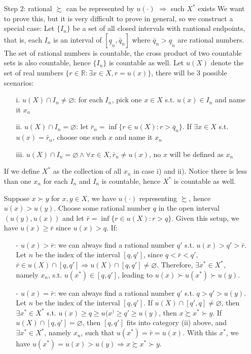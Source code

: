 \begin{enumerate}
    \item[Step 2:] rational $\succsim$ can be represented by $u(\cdot)$ $\Rightarrow$ such $X^*$ exists
    We want to prove this, but it is very difficult to prove in general, so we construct a special case: Let $\{I_n\}$ be a set of all closed intervals with rantional endpoints, that is, each $I_n$ is an interval of $[\underline{q}_n,\bar{q}_n]$ where $\bar{q}_n>\underline{q}_n$ are rational numbers.
    The set of rational numbers is countable, the cross product of two countable sets is also countable, hence $\{I_n\}$ is countable as well. Let $u(X)$ denote the set of real numbers $\{r\in \mathbb{R}: \exists x\in X, r=u(x)\}$, there will be 3 possible scenarios:
    \begin{enumerate}
        \item[i.] $u(X)\cap I_n\neq \varnothing$: for each $I_n$, pick one $x\in X$ s.t. $u(x)\in I_n$ and name it $x_n$
        \item[ii.] $u(X)\cap I_n =\varnothing$: let $\bar{r}_n=\inf \{r\in u(X):r>\bar{q}_n\}$. If $\exists x\in X$ s.t. $u(x)=\bar{r}_n$, choose one such $x$ and name it $x_n$
        \item[iii.] $u(X)\cap I_n=\varnothing\land \forall x\in X, \bar{r}_n\neq u(x)$, no $x$ will be defined as $x_n$
    \end{enumerate}
    If we define $X^*$ as the collection of all $x_n$ in case i) and ii). Notice there is less than one $x_n$ for each $I_n$ and $I_n$ is countable, hence $X^*$ is countable as well.

    Suppose $x\succ y$ for $x,y\in X$, we have $u(\cdot)$ representing $\succsim$, hence $u(x)>u(y)$. Choose some rational number $q$ in the open interval $(u(y),u(x))$ and let $\bar{r}=\inf \{r\in u(X):r>q\}$. Given this setup, we have $u(x)\geq \bar{r}$ since $u(x)>q$. If:
    \begin{enumerate}
        \item[-] $u(x)>\bar{r}$: we can always find a rational number $q'$ s.t. $u(x)>q'>\bar{r}$. Let $n$ be the index of the interval $[q,q']$, since $q<\bar{r}<q'$, $\bar{r}\in u(X)\cap[q,q']\Rightarrow u(X)\cap[q,q']\neq \varnothing$. Therefore, $\exists x^*\in X^*$, namely $x_n$, s.t. $u(x^*)\in [q,q']$, leading to $u(x)\succ u(x^*)\succ u(y)$.
        \item[-] $u(x)=\bar{r}$: we can always find a rational number $q'$ s.t. $q>q'>u(y)$. Let $n$ be the index of the interval $[q,q']$. If $u(X)\cap [q',q]\neq \varnothing$, then $\exists x^*\in X^*$ s.t. $u(x)\geq q\geq u(x^)\geq q'\geq u(y)$, then $x\succsim x^*\succ y$. If $u(X)\cap [q,q']=\varnothing$, then $[q,q']$ fits into category (ii) above, and $\exists x^*\in X^*$, namely $x_n$, such that $u(x^*)=\bar{r}=u(x)$. With this $x^*$, we have $u(x^*)=u(x)>u(y)\Rightarrow x\succsim x^*\succ y$.
    \end{enumerate}
\end{enumerate}

